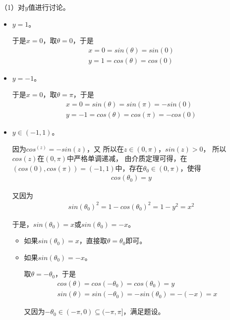\documentclass{article}
\begin{document}
（1）对$y$值进行讨论。
\begin{itemize}
  \item $y = 1$。

        于是$x = 0$，取$\theta = 0$，于是
        \begin{align*}
          x = 0 = sin(\theta) = sin(0) \\
          y = 1 = cos(\theta) = cos(0)
        \end{align*}

  \item $y = -1$。

        于是$x = 0$，取$\theta = \pi$，于是
        \begin{align*}
          x = 0 = sin(\theta) = sin(\pi) = -sin(0) \\
          y = -1 = cos(\theta) = cos(\pi) = -cos(0)
        \end{align*}

  \item $y \in (-1, 1)$。

        因为$cos^(z) = -sin(z)$，又
        所以在$z \in (0, \pi)$，$sin(z) > 0$，
        所以$cos(z)$在$(0, \pi)$中严格单调递减，
        由介质定理可得，在$(cos(0), cos(\pi)) = (-1, 1)$中，存在$\theta_0 \in (0, \pi)$，使得
        \begin{align*}
          cos(\theta_0) = y
        \end{align*}

        又因为
        \begin{align*}
          sin(\theta_0)^2 = 1 - cos(\theta_0)^2 = 1 - y^2 = x^2
        \end{align*}

        于是，$sin(\theta_0) = x$或$sin(\theta_0) = -x$。

        \begin{itemize}
          \item 如果$sin(\theta_0) = x$，直接取$\theta = \theta_0$即可。
          \item 如果$sin(\theta_0) = -x$。

                取$\theta = - \theta_0$，于是
                \begin{align*}
                  cos(\theta) = cos(-\theta_0) = cos(\theta_0) = y \\
                  sin(\theta) = sin(-\theta_0) = -sin(\theta_0) = -(-x) = x
                \end{align*}

                又因为$-\theta_0 \in (-\pi, 0) \subseteq (-\pi, \pi]$，满足题设。
        \end{itemize}
\end{itemize}
\end{document}
